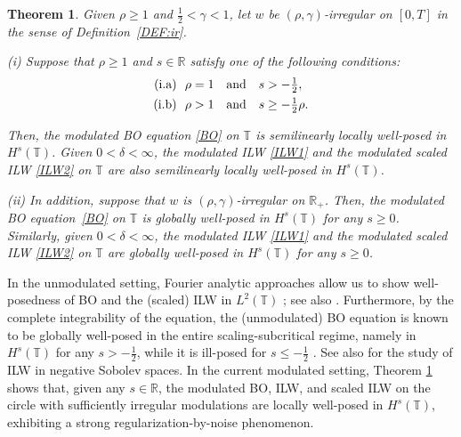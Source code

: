 \documentclass[letterpaper, 11pt,  reqno]{amsart}
\newtheorem{theorem}{Theorem} [section]
\newcommand{\1}{\hspace{0.5mm}\text{I}\hspace{0.5mm}}
\newcommand{\noi}{\noindent}
\newcommand{\R}{\mathbb{R}}
\newcommand{\T}{\mathbb{T}}
\newcommand{\dl}{\delta}
\newcommand{\g}{\gamma}
\numberwithin{equation}{section}
\numberwithin{theorem}{section}
\begin{document}
\begin{theorem}
\label{THM:4}
Given $\rho \ge  1$ and  $\frac12< \g < 1$, 
let  $w$ be $(\rho,\g)$-irregular on $[0, T]$ in the sense of Definition~\ref{DEF:ir}.

\smallskip

\noi
\textup{(i)}
Suppose that $\rho \ge 1$ and $s\in \R$
satisfy one of the following conditions\textup{:}
\begin{align}
\begin{split}
\textup{(i.a)} &\ \   \rho =  1 \quad \text{and} \quad s > - \tfrac 12, \\
\textup{(i.b)} &\ \  \rho >  1 \quad  \text{and} \quad  s \ge - \tfrac 12 \rho.
\end{split}
\label{regBO1}
\end{align}

\noi
Then, the modulated BO equation \eqref{BO}
on  $\T$
is semilinearly  locally well-posed in $H^s(\T)$.
Given $0 < \dl < \infty$, 
the modulated 
ILW \eqref{ILW1}
and
the modulated 
scaled ILW \eqref{ILW2}
on  $\T$
are also semilinearly  locally well-posed in $H^s(\T)$.




\smallskip


\noi
\textup{(ii)}
In addition, suppose that 
  $w$ is $(\rho,\g)$-irregular on $\R_+$.
Then, the modulated BO equation~\eqref{BO} 
on $\T$ is globally well-posed in $H^s(\T)$ for any $s \ge 0$.
Similarly, 
given $0 < \dl < \infty$, 
the modulated 
ILW \eqref{ILW1}
and
the modulated 
scaled ILW \eqref{ILW2}
on $\T$ are globally well-posed in $H^s(\T)$ for any $s \ge 0$.



\end{theorem}




In the unmodulated setting, 
Fourier analytic approaches
allow us to show well-posedness of 
BO and the (scaled) ILW  in $L^2(\T)$
\cite{Moli1, Moli2, MP, CLOP};
see also \cite{Deng15}.
Furthermore, 
by the complete integrability of the equation, 
the (unmodulated) BO equation 
is known to be globally well-posed
in the entire scaling-subcritical regime, 
namely in $H^s(\T)$ for any $s > - \frac 12$, 
while it is ill-posed for $s \le -\frac 12$
\cite{GKT23, KLV}.
See also \cite{CFLOP}
for the study of ILW in negative Sobolev spaces.
In the current modulated setting, 
Theorem \ref{THM:4}
shows that, 
 given  any $s \in \R$, 
the modulated BO, ILW, and scaled ILW
on  the circle
with sufficiently irregular modulations
are locally well-posed in $H^s(\T)$, 
exhibiting a strong regularization-by-noise phenomenon.
\end{document}
